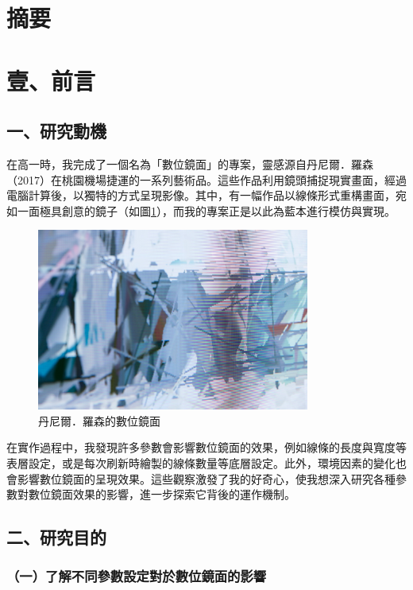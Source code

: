 \documentclass[12pt]{article}
\begin{document}
\section{摘要}

\newpage

\section{壹、前言}

\subsection{一、研究動機}

在高一時，我完成了一個名為「數位鏡面」的專案，靈感源自丹尼爾．羅森（2017）在桃園機場捷運的一系列藝術品。這些作品利用鏡頭捕捉現實畫面，經過電腦計算後，以獨特的方式呈現影像。其中，有一幅作品以線條形式重構畫面，宛如一面極具創意的鏡子（如圖\ref{fig:mirror_example_1}），而我的專案正是以此為藍本進行模仿與實現。

\begin{figure}[htbp]
  \centering
  \includegraphics[width=0.8\textwidth]{img//mirror_example_1.jpg}
  \caption{丹尼爾．羅森的數位鏡面}\label{fig:mirror_example_1}
\end{figure}

在實作過程中，我發現許多參數會影響數位鏡面的效果，例如線條的長度與寬度等表層設定，或是每次刷新時繪製的線條數量等底層設定。此外，環境因素的變化也會影響數位鏡面的呈現效果。這些觀察激發了我的好奇心，使我想深入研究各種參數對數位鏡面效果的影響，進一步探索它背後的運作機制。

\subsection{二、研究目的}

\subsubsection{（一）了解不同參數設定對於數位鏡面的影響}
\end{document}

